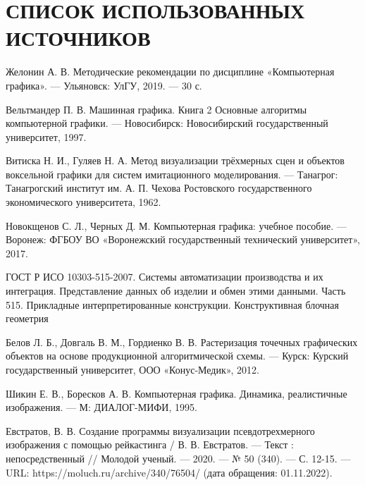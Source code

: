 \section*{СПИСОК ИСПОЛЬЗОВАННЫХ ИСТОЧНИКОВ}

\begingroup
\renewcommand{\section}[2]{}

\begin{thebibliography}{}
	Желонин А. В. Методические рекомендации по дисциплине «Компьютерная графика». --- Ульяновск: УлГУ, 2019. --- 30 с.
	
	Вельтмандер П. В. Машинная графика. Книга 2 Основные алгоритмы компьютерной графики. --- Новосибирск: Новосибирский государственный университет, 1997.
	
	Витиска Н. И., Гуляев Н. А. Метод визуализации трёхмерных сцен и объектов воксельной графики для систем имитационного моделирования. --- Танагрог: Танагрогский институт им. А. П. Чехова Ростовского государственного экономического университета, 1962.
	
	Новокщенов С. Л., Черных Д. М. Компьютерная графика: учебное пособие. --- Воронеж: ФГБОУ ВО
	«Воронежский государственный технический университет», 2017.
	
	ГОСТ Р ИСО 10303-515-2007. Системы автоматизации производства и их интеграция. Представление данных об изделии и обмен этими данными. Часть 515. Прикладные интерпретированные конструкции. Конструктивная блочная геометрия
	
	Белов Л. Б., Довгаль В. М., Гордиенко В. В. Растеризация точечных графических объектов на основе продукционной алгоритмической схемы. --- Курск: Курский государственный университет, ООО «Конус-Медик», 2012.
	
	Шикин Е. В., Боресков А. В. Компьютерная графика. Динамика, реалистичные изображения. --- М: ДИАЛОГ-МИФИ, 1995.
	
	Евстратов, В. В. Создание программы визуализации псевдотрехмерного изображения с помощью рейкастинга / В. В. Евстратов. — Текст : непосредственный // Молодой ученый. — 2020. — № 50 (340). — С. 12-15. — URL: https://moluch.ru/archive/340/76504/ (дата обращения: 01.11.2022).
	

\end{thebibliography}
